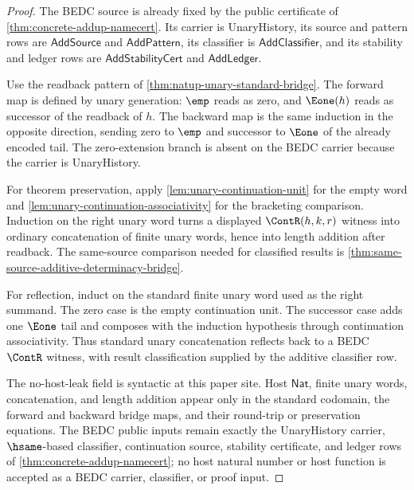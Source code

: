 \begin{proof}
The BEDC source is already fixed by the public certificate of
\autoref{thm:concrete-addup-namecert}. Its carrier is UnaryHistory, its source
and pattern rows are $\mathsf{AddSource}$ and $\mathsf{AddPattern}$, its
classifier is $\mathsf{AddClassifier}$, and its stability and ledger rows are
$\mathsf{AddStabilityCert}$ and $\mathsf{AddLedger}$.

Use the readback pattern of \autoref{thm:natup-unary-standard-bridge}. The
forward map is defined by unary generation: $\emp$ reads as zero, and
$\Eone(h)$ reads as successor of the readback of $h$. The backward map is the
same induction in the opposite direction, sending zero to $\emp$ and successor
to $\Eone$ of the already encoded tail. The zero-extension branch is absent on
the BEDC carrier because the carrier is UnaryHistory.

For theorem preservation, apply
\autoref{lem:unary-continuation-unit} for the empty word and
\autoref{lem:unary-continuation-associativity} for the bracketing comparison.
Induction on the right unary word turns a displayed $\ContR(h,k,r)$ witness
into ordinary concatenation of finite unary words, hence into length addition
after readback. The same-source comparison needed for classified results is
\autoref{thm:same-source-additive-determinacy-bridge}.

For reflection, induct on the standard finite unary word used as the right
summand. The zero case is the empty continuation unit. The successor case
adds one $\Eone$ tail and composes with the induction hypothesis through
continuation associativity. Thus standard unary concatenation reflects back
to a BEDC $\ContR$ witness, with result classification supplied by the
additive classifier row.

The no-host-leak field is syntactic at this paper site. Host $\mathsf{Nat}$,
finite unary words, concatenation, and length addition appear only in the
standard codomain, the forward and backward bridge maps, and their round-trip
or preservation equations. The BEDC public inputs remain exactly the
UnaryHistory carrier, $\hsame$-based classifier, continuation source, stability
certificate, and ledger rows of \autoref{thm:concrete-addup-namecert}; no host
natural number or host function is accepted as a BEDC carrier, classifier, or
proof input.
\end{proof}
